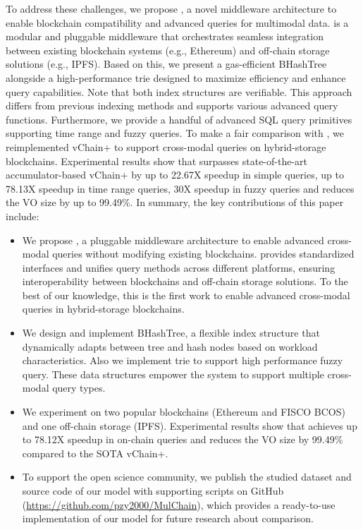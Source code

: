 To address these challenges, we propose \textit{\Chain}, a novel middleware architecture to enable blockchain compatibility and advanced queries for multimodal data. 
\Chain is a modular and pluggable middleware that orchestrates seamless integration between existing blockchain systems (e.g., Ethereum) and off-chain storage solutions (e.g., IPFS). 
Based on this, we present a gas-efficient BHashTree alongside a high-performance trie designed to maximize efficiency and enhance query capabilities.
Note that both index structures are verifiable. 
This approach differs from previous indexing methods and supports various advanced query functions. 
Furthermore, we provide a handful of advanced SQL query primitives supporting time range and fuzzy queries. To make a fair comparison with \Chain, we reimplemented vChain+ to support cross-modal queries on hybrid-storage blockchains. 
Experimental results show that \Chain surpasses state-of-the-art accumulator-based vChain+ by up to 22.67X speedup in simple queries, up to 78.13X speedup in time range queries, 30X speedup in fuzzy queries and reduces the VO size by up to 99.49\%.
In summary, the key contributions of this paper include:

\begin{itemize}[leftmargin=*]
    \item We propose \Chain, a pluggable middleware architecture to enable advanced cross-modal queries without modifying existing blockchains. 
    \Chain provides standardized interfaces and unifies query methods across different platforms, ensuring interoperability between blockchains and off-chain storage solutions. To the best of our knowledge, this is the first work to enable advanced cross-modal queries in hybrid-storage blockchains.

    \item We design and implement BHashTree, a flexible index structure that dynamically adapts between tree and hash nodes based on workload characteristics. Also we implement trie to support high performance fuzzy query. These data structures empower the system to support multiple cross-modal query types.

    \item We experiment on two popular blockchains (Ethereum and FISCO BCOS) and one off-chain storage (IPFS). 
    Experimental results show that \Chain achieves up to 78.12X speedup in on-chain queries and reduces the VO size by 99.49\% compared to the SOTA vChain+.

    \item To support the open science community, we publish the studied dataset and source code of our model with supporting scripts on GitHub ({\url{https://github.com/pzy2000/MulChain}}), which provides a ready-to-use implementation of our model for future research about comparison.
\end{itemize}
